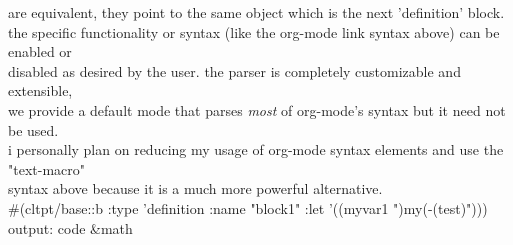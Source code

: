 \documentclass[11pt]{article}
\begin{document}
are equivalent, they point to the same object which is the next 'definition' block.\\the specific functionality or syntax (like the org-mode link syntax above) can be enabled or\\disabled as desired by the user. the parser is completely customizable and extensible,\\we provide a default mode that parses \textit{most} of org-mode's syntax but it need not be used.\\i personally plan on reducing my usage of org-mode syntax elements and use the "text-macro"\\syntax above because it is a much more powerful alternative.\\\#(cltpt/base::b :type 'definition :name "block1" :let '((myvar1 ")my(-(test)")))\\output: %
code                             &math                  
\end{document}
